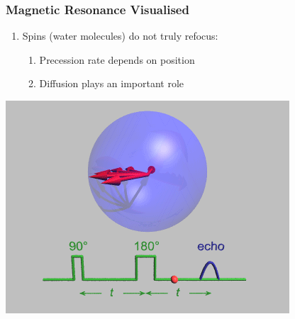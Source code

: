 \begin{frame}
\frametitle{Magnetic Resonance Visualised}
\begin{enumerate}
    \item Spins (water molecules) do not truly refocus:
    \pause
    \begin{enumerate}
        \item Precession rate depends on position
        \pause
        \item Diffusion plays an important role
    \end{enumerate}
\end{enumerate}
\centering
\includegraphics[width=0.55\linewidth]{gifs/HahnEcho_GWM-165}
\end{frame}

